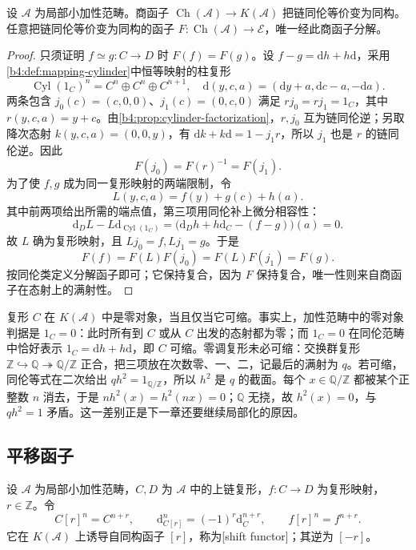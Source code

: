 \begin{proposition}\label{b4:prop:homotopy-universal}
	设 \(\mathcal A\) 为局部小加性范畴。商函子 \(\operatorname{Ch}(\mathcal A)\to K(\mathcal A)\) 把链同伦等价变为同构。任意把链同伦等价变为同构的函子 \(F:\operatorname{Ch}(\mathcal A)\to\mathcal E\)，唯一经此商函子分解。
\end{proposition}
\begin{proof}
	只须证明 \(f\simeq g:C\to D\) 时 \(F(f)=F(g)\)。设 \(f-g=\mathrm{d}h+h\mathrm{d}\)，采用\cref{b4:def:mapping-cylinder}中恒等映射的柱复形
	\[
		\operatorname{Cyl}(1_C)^n=C^n\oplus C^n\oplus C^{n+1},\quad \mathrm{d}(y,c,a)=(\mathrm{d}y+a,\mathrm{d}c-a,-\mathrm{d}a).
	\]
	两条包含 \(j_0(c)=(c,0,0)\)、\(j_1(c)=(0,c,0)\) 满足 \(rj_0=rj_1=1_C\)，其中 \(r(y,c,a)=y+c\)。由\cref{b4:prop:cylinder-factorization}，\(r,j_0\) 互为链同伦逆；另取降次态射 \(k(y,c,a)=(0,0,y)\)，有 \(\mathrm{d}k+k\mathrm{d}=1-j_1r\)，所以 \(j_1\) 也是 \(r\) 的链同伦逆。因此
	\[
		F(j_0)=F(r)^{-1}=F(j_1).
	\]
	为了使 \(f,g\) 成为同一复形映射的两端限制，令
	\[
		L(y,c,a)=f(y)+g(c)+h(a).
	\]
	其中前两项给出所需的端点值，第三项用同伦补上微分相容性：
	\[
		\mathrm{d}_D L-L\mathrm{d}_{\operatorname{Cyl}(1_C)} =\bigl(\mathrm{d}_Dh+h\mathrm{d}_C-(f-g)\bigr)(a)=0.
	\]
	故 \(L\) 确为复形映射，且 \(Lj_0=f,Lj_1=g\)。于是
	\[
		F(f)=F(L)F(j_0)=F(L)F(j_1)=F(g).
	\]
	按同伦类定义分解函子即可；它保持复合，因为 \(F\) 保持复合，唯一性则来自商函子在态射上的满射性。
\end{proof}

复形 \(C\) 在 \(K(\mathcal A)\) 中是零对象，当且仅当它可缩。事实上，加性范畴中的零对象判据是 \(1_C=0\)：此时所有到 \(C\) 或从 \(C\) 出发的态射都为零；而 \(1_C=0\) 在同伦范畴中恰好表示 \(1_C=\mathrm dh+h\mathrm d\)，即 \(C\) 可缩。零调复形未必可缩：交换群复形 \(\mathbb Z\hookrightarrow\mathbb Q\twoheadrightarrow\mathbb Q/\mathbb Z\) 正合，把三项放在次数零、一、二，记最后的满射为 \(q\)。若可缩，同伦等式在二次给出 \(qh^2=1_{\mathbb Q/\mathbb Z}\)，所以 \(h^2\) 是 \(q\) 的截面。每个 \(x\in\mathbb Q/\mathbb Z\) 都被某个正整数 \(n\) 消去，于是 \(nh^2(x)=h^2(nx)=0\)；\(\mathbb Q\) 无挠，故 \(h^2(x)=0\)，与 \(qh^2=1\) 矛盾。这一差别正是下一章还要继续局部化的原因。

\subsection{平移函子}
\label{b4:subsec:1601:02}

\begin{definition}\label{b4:def:homotopy-shift}
	设 \(\mathcal A\) 为局部小加性范畴，\(C,D\) 为 \(\mathcal A\) 中的上链复形，\(f:C\to D\) 为复形映射，\(r\in\mathbb Z\)。令
	\[
		C[r]^n=C^{n+r},\qquad \mathrm{d}_{C[r]}^n=(-1)^r \mathrm{d}_C^{n+r},\qquad f[r]^n=f^{n+r}.
	\]
	它在 \(K(\mathcal A)\) 上诱导自同构函子 \([r]\)，称为[shift functor]；其逆为 \([-r]\)。
\end{definition}

